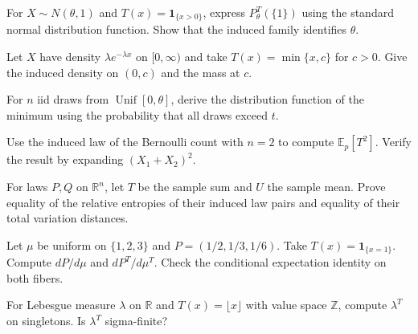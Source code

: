 \documentclass[11pt,oneside]{book}
\theoremstyle{definition}
\theoremstyle{remark}
\newcommand{\R}{\mathbb R}
\begin{document}
\begin{practiceexercise}
\label{pex:statistic-normal-threshold}
For $X\sim N(\theta,1)$ and $T(x)=\mathbf 1_{\{x>0\}}$,
express $P_\theta^T(\{1\})$ using the standard normal distribution
function. Show that the induced family identifies $\theta$.
\end{practiceexercise}

\begin{practiceexercise}
\label{pex:statistic-censored-exponential}
Let $X$ have density $\lambda e^{-\lambda x}$ on $[0,\infty)$
and take $T(x)=\min\{x,c\}$ for $c>0$. Give the induced density
on $(0,c)$ and the mass at $c$.
\end{practiceexercise}

\begin{practiceexercise}
\label{pex:statistic-uniform-minimum}
For $n$ iid draws from $\operatorname{Unif}[0,\theta]$, derive
the distribution function of the minimum using the probability
that all draws exceed $t$.
\end{practiceexercise}

\begin{practiceexercise}
\label{pex:statistic-count-moments}
Use the induced law of the Bernoulli count with $n=2$ to compute
$\mathbb E_p[T^2]$. Verify the result by expanding $(X_1+X_2)^2$.
\end{practiceexercise}

\begin{practiceexercise}
\label{pex:statistic-mean-sum-distances}
For laws $P,Q$ on $\R^n$, let $T$ be the sample sum and $U$ the
sample mean. Prove equality of the relative entropies of their
induced law pairs and equality of their total variation distances.
\end{practiceexercise}

\begin{practiceexercise}
\label{pex:statistic-finite-induced-density}
Let $\mu$ be uniform on $\{1,2,3\}$ and $P=(1/2,1/3,1/6)$.
Take $T(x)=\mathbf 1_{\{x=1\}}$. Compute $dP/d\mu$ and
$dP^T/d\mu^T$. Check the conditional expectation identity
on both fibers.
\end{practiceexercise}

\begin{practiceexercise}
\label{pex:statistic-floor-lebesgue}
For Lebesgue measure $\lambda$ on $\R$ and $T(x)=\lfloor x\rfloor$
with value space $\mathbb Z$, compute $\lambda^T$ on singletons.
Is $\lambda^T$ sigma-finite?
\end{practiceexercise}
\end{document}

